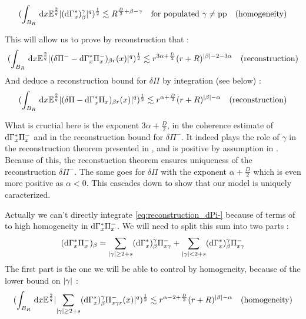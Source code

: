 \begin{equation}
    (\int_{B_R} \,\mathrm{d} x \mathbb{E}^{\frac{2}{q}} \lvert(\mathrm{d}\Gamma^*_x)^\gamma_\beta\rvert^q)^{\frac{1}{2}} \lesssim R^{\frac{D}{2}+\beta - \gamma} \quad \text{for populated }\gamma \neq \text{pp} \quad \text{(homogeneity)}\label{eq:estimate_dG}
\end{equation}


This will allow us to prove by reconstruction that : 
\begin{equation}
    (\int_{B_R} \,\mathrm{d} x \mathbb{E}^{\frac{2}{q}}\lvert(\delta \Pi^- - \mathrm{d}\Gamma^*_{x} \Pi^-_{x})_{\beta r}(x)\rvert^q)^{\frac{1}{2}} \lesssim r^{3\alpha + \frac{D}{2}}(r+R)^{\lvert\beta\rvert-2-3\alpha} \quad \text{(reconstruction)} \label{eq:reconstruction_dPi-}
\end{equation}
And deduce a reconstruction bound for $\delta \Pi$ by integration (see below) : 
\begin{equation}
    (\int_{B_R} \,\mathrm{d} x \mathbb{E}^{\frac{2}{q}}\lvert(\delta \Pi - \mathrm{d}\Gamma^*_{x} \Pi_{x})_{\beta r}(x)\rvert^q)^{\frac{1}{2}} \lesssim r^{\alpha + \frac{D}{2}}(r+R)^{\lvert\beta\rvert-\alpha} \quad \text{(reconstruction)} \label{eq:reconstruction_dPi}
\end{equation}

What is cructial here is the exponent $3\alpha + \frac{D}{2}$, in the coherence estimate of $\mathrm{d}\Gamma^*_x \Pi^-_x$ and in the reconstruction bound for $\delta \Pi^-$. It indeed plays the role of $\gamma$ in the reconstruction theorem presented in \cite{BL21}, and is positive by assumption in \cite{BOT25}. Because of this, the reconstuction theorem ensures uniqueness of the reconstruction $\delta \Pi^-$.
The same goes for $\delta \Pi$ with the exponent $\alpha + \frac{D}{2}$ which is even more positive as $\alpha < 0$.  
This cascades down to show that our model is uniquely caracterized.

Actually we can't directly integrate \eqref{eq:reconstruction_dPi-} because of terms of to high homogeneity in $\mathrm{d}\Gamma^*_x \Pi^-_x$.
We will need to split this sum into two parts : 
$$(\mathrm{d}\Gamma^*_x \Pi^-_x)_\beta = \sum_{\lvert\gamma\rvert\geq 2+s}(\mathrm{d}\Gamma^*_x)^\gamma_\beta \Pi^-_{x\gamma} + \sum_{\lvert\gamma\rvert< 2+s}(\mathrm{d}\Gamma^*_x)^\gamma_\beta \Pi^-_{x\gamma}$$
The first part is the one we will be able to control by homogeneity, because of the lower bound on $\lvert\gamma\rvert$ : 
\begin{equation}
    (\int_{B_R} \,\mathrm{d} x \mathbb{E}^{\frac{2}{q}} \lvert\sum_{\lvert\gamma\rvert\geq 2+s}(\mathrm{d}\Gamma^*_x)^\gamma_\beta \Pi^-_{x\gamma r}(x)\rvert^q)^\frac{1}{2} \lesssim r^{\alpha - 2 + \frac{D}{2}}(r+R)^{\lvert\beta\rvert - \alpha} \quad \text{(homogeneity)} \label{eq:homdGPi-}
\end{equation}  

